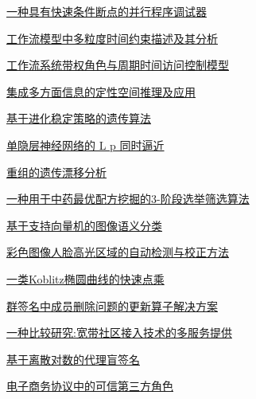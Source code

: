 \documentclass[a4paper]{article}
\begin{document}
\href{http://www.jos.org.cn/ch/reader/download_pdf.aspx?file_no=20031102&year_id=2003&quarter_id=11&falg=1}{一种具有快速条件断点的并行程序调试器}

\href{http://www.jos.org.cn/ch/reader/download_pdf.aspx?file_no=20031103&year_id=2003&quarter_id=11&falg=1}{工作流模型中多粒度时间约束描述及其分析}

\href{http://www.jos.org.cn/ch/reader/download_pdf.aspx?file_no=20031104&year_id=2003&quarter_id=11&falg=1}{工作流系统带权角色与周期时间访问控制模型}

\href{http://www.jos.org.cn/ch/reader/download_pdf.aspx?file_no=20031106&year_id=2003&quarter_id=11&falg=1}{集成多方面信息的定性空间推理及应用}

\href{http://www.jos.org.cn/ch/reader/download_pdf.aspx?file_no=20031107&year_id=2003&quarter_id=11&falg=1}{基于进化稳定策略的遗传算法}

\href{http://www.jos.org.cn/ch/reader/download_pdf.aspx?file_no=20031108&year_id=2003&quarter_id=11&falg=1}{单隐层神经网络的 L p 同时逼近}

\href{http://www.jos.org.cn/ch/reader/download_pdf.aspx?file_no=20031109&year_id=2003&quarter_id=11&falg=1}{重组的遗传漂移分析}

\href{http://www.jos.org.cn/ch/reader/download_pdf.aspx?file_no=20031110&year_id=2003&quarter_id=11&falg=1}{一种用于中药最优配方挖掘的3-阶段选举筛选算法}

\href{http://www.jos.org.cn/ch/reader/download_pdf.aspx?file_no=20031111&year_id=2003&quarter_id=11&falg=1}{基于支持向量机的图像语义分类}

\href{http://www.jos.org.cn/ch/reader/download_pdf.aspx?file_no=20031112&year_id=2003&quarter_id=11&falg=1}{彩色图像人脸高光区域的自动检测与校正方法}

\href{http://www.jos.org.cn/ch/reader/download_pdf.aspx?file_no=20031113&year_id=2003&quarter_id=11&falg=1}{一类Koblitz椭圆曲线的快速点乘}

\href{http://www.jos.org.cn/ch/reader/download_pdf.aspx?file_no=20031114&year_id=2003&quarter_id=11&falg=1}{群签名中成员删除问题的更新算子解决方案}

\href{http://www.jos.org.cn/ch/reader/download_pdf.aspx?file_no=20031115&year_id=2003&quarter_id=11&falg=1}{一种比较研究:宽带社区接入技术的多服务提供}

\href{http://www.jos.org.cn/ch/reader/download_pdf.aspx?file_no=20031116&year_id=2003&quarter_id=11&falg=1}{基于离散对数的代理盲签名}

\href{http://www.jos.org.cn/ch/reader/download_pdf.aspx?file_no=20031117&year_id=2003&quarter_id=11&falg=1}{电子商务协议中的可信第三方角色}
\end{document}
